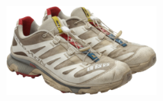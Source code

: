 \documentclass[10pt]{article}
\begin{document}
\begin{minipage}[c][50.60mm][c]{50.60mm}
\end{minipage} \hspace*{6.00mm} \begin{minipage}[c][50.60mm][c]{50.60mm}\centering
\includegraphics[width=50.60mm,height=50.60mm,keepaspectratio]{assets/shoes/salomon-xt-4-og.png}\
\end{minipage}\
\vspace*{6.00mm}\
\newpage
\end{document}
